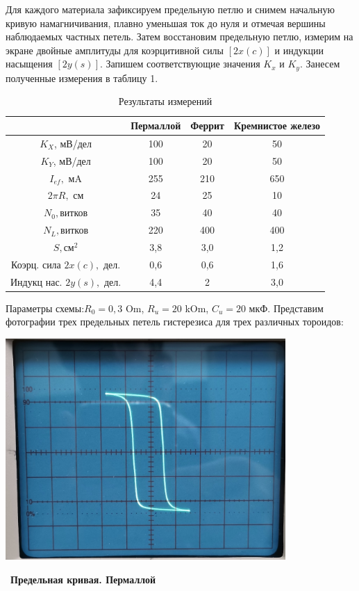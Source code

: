 Для каждого материала зафиксируем предельную петлю и снимем начальную кривую намагничивания, плавно уменьшая ток до нуля и отмечая вершины наблюдаемых частных петель. Затем восстановим предельную петлю, измерим на экране двойные амплитуды для коэрцитивной силы $[2x(c)]$ и индукции насыщения $[2y(s)]$. Запишем соответствующие значения $K_x$ и $K_y$. Занесем полученные измерения в таблицу 1.

\begin{table}[h!]
	\centering
	\caption{Результаты измерений}
    \begin{tabular}{|c|c|c|c|}
	\hline 
	 & Пермаллой & Феррит & Кремнистое железо \\ 
	 \hline 
	$K_X$, мВ/дел & 100 & 20 & 50 \\
    \hline
	$K_Y$, мВ/дел & 100 & 20 & 50 \\ 
	\hline
	$I_{ef},$ мA & 255 & 210 & 650 \\ 
	\hline
	$2\pi R,$ см & 24 & 25 & 10 \\ 
	\hline
	$N_0,$витков & 35 & 40 & 40 \\ 
	\hline
	$N_L,$витков & 220 & 400 & 400 \\ 
	\hline
	$S,{см}^2$ & 3,8 & 3,0 & 1,2 \\ 
	\hline
	Коэрц. сила $2x(c),$ дел. & 0,6 & 0,6 & 1,6 \\ 
	\hline
	Индукц нас. $2y(s),$ дел. & 4,4 & 2 & 3,0 \\	
	\hline
	\end{tabular}%
\label{resT}%
\end{table}%

\newpage

Параметры схемы:$R_0=0,3$ Om, $R_u=20$ kOm, $C_u=20$ мкФ.
Представим фотографии трех предельных петель гистерезиса для трех различных тороидов:

\newpage
\newpage

\begin{center}
	\includegraphics[width = 0.8\textwidth]{pics/1.jpg}
\end{center}\
\textbf{Предельная кривая. Пермаллой}


